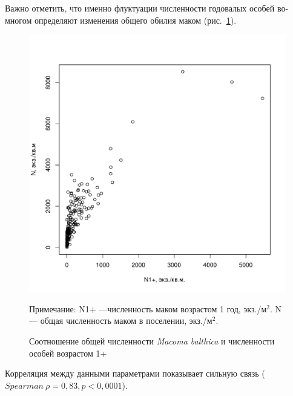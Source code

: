 Важно отметить, что именно флуктуации численности годовалых особей во-многом определяют изменения общего обилия маком (рис.~\ref{ris:N1year_vs_Nall}).
    \begin{figure}[hbp]
        \includegraphics[width=\textwidth]{../White_Sea/oneyear_all_Kandalaksha_all/N1y_vs_N2_1.pdf}
    \caption{Соотношение общей численности {\it Macoma balthica} и численности особей возрастом 1+}
    \label{ris:N1year_vs_Nall}

	\footnotesize{Примечание: N1+ ---численность маком возрастом 1 год, экз./м$^2$. N --- общая численность маком в поселении, экз./м$^2$.}
    \end{figure}
Корреляция между данными параметрами показывает сильную связь ($Spearman\ \rho = 0,83, p < 0,0001$).

